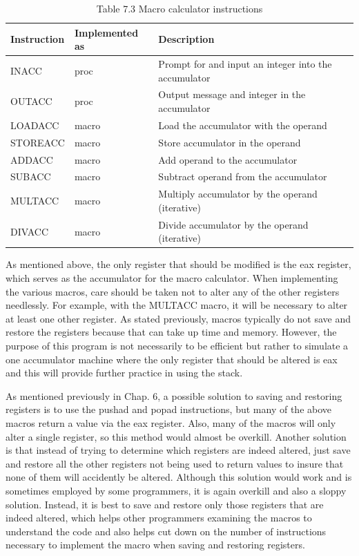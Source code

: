 \documentclass[10pt]{book}
\begin{document}
\begin{table}[htbp]
\begin{center}
\captionsetup{labelformat=empty}
\caption{Table 7.3 Macro calculator instructions}
\begin{tabular}{|l|l|l|}
\hline
Instruction & Implemented as & Description \\

\hline
INACC & proc & Prompt for and input an integer into the accumulator \\
\hline
OUTACC & proc & Output message and integer in the accumulator \\
\hline
LOADACC & macro & Load the accumulator with the operand \\
\hline
STOREACC & macro & Store accumulator in the operand \\
\hline
ADDACC & macro & Add operand to the accumulator \\
\hline
SUBACC & macro & Subtract operand from the accumulator \\
\hline
MULTACC & macro & Multiply accumulator by the operand (iterative) \\
\hline
DIVACC & macro & Divide accumulator by the operand (iterative) \\
\hline
\end{tabular}
\end{center}
\end{table}

As mentioned above, the only register that should be modified is the eax register, which serves as the accumulator for the macro calculator. When implementing the various macros, care should be taken not to alter any of the other registers needlessly. For example, with the MULTACC macro, it will be necessary to alter at least one other register. As stated previously, macros typically do not save and restore the registers because that can take up time and memory. However, the purpose of this program is not necessarily to be efficient but rather to simulate a one accumulator machine where the only register that should be altered is eax and this will provide further practice in using the stack.

As mentioned previously in Chap. 6, a possible solution to saving and restoring registers is to use the pushad and popad instructions, but many of the above macros return a value via the eax register. Also, many of the macros will only alter a single register, so this method would almost be overkill. Another solution is that instead of trying to determine which registers are indeed altered, just save and restore all the other registers not being used to return values to insure that none of them will accidently be altered. Although this solution would work and is sometimes employed by some programmers, it is again overkill and also a sloppy solution. Instead, it is best to save and restore only those registers that are indeed altered, which helps other programmers examining the macros to understand the code and also helps cut down on the number of instructions necessary to implement the macro when saving and restoring registers.
\end{document}
